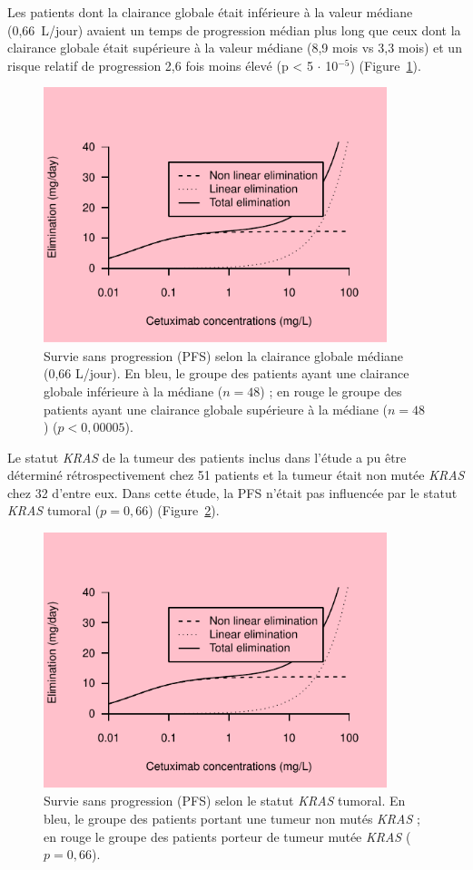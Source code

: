 Les patients dont la clairance globale était inférieure à la valeur médiane (0,66~L/jour) avaient un temps de progression médian plus long que ceux dont la clairance globale était supérieure à la valeur médiane (8,9 mois vs 3,3 mois) et un risque relatif de progression 2,6 fois moins élevé (p < 5 $\cdot$ 10$^{-5}$) (Figure~\ref{fig:24}). 
\begin{figure}[htbp]
	\centering
		\includegraphics[width=10cm]{images/essai001.pdf}
	\caption{Survie sans progression (PFS) selon la clairance globale médiane (0,66 L/jour). En bleu, le groupe des patients ayant une clairance globale inférieure à la médiane ($n = 48$) ; en rouge le groupe des patients ayant une clairance globale supérieure à la médiane ($n = 48$) ($p < 0,00005$).}
	\label{fig:24}
\end{figure}
Le statut \textit{KRAS} de la tumeur des patients inclus dans l'étude a pu être déterminé rétrospectivement chez 51 patients et la tumeur était non mutée \textit{KRAS} chez 32 d'entre eux. Dans cette étude, la PFS n'était pas influencée par le statut \textit{KRAS} tumoral ($p = 0,66$) (Figure~\ref{fig:25}).
\begin{figure}[htbp]
	\centering
		\includegraphics[width=10cm]{images/essai001.pdf}
	\caption{Survie sans progression (PFS) selon le statut \textit{KRAS} tumoral. En bleu, le groupe des patients portant une tumeur non mutés \textit{KRAS} ; en rouge le groupe des patients porteur de tumeur mutée \textit{KRAS} ($p = 0,66$).}
	\label{fig:25}
\end{figure}
